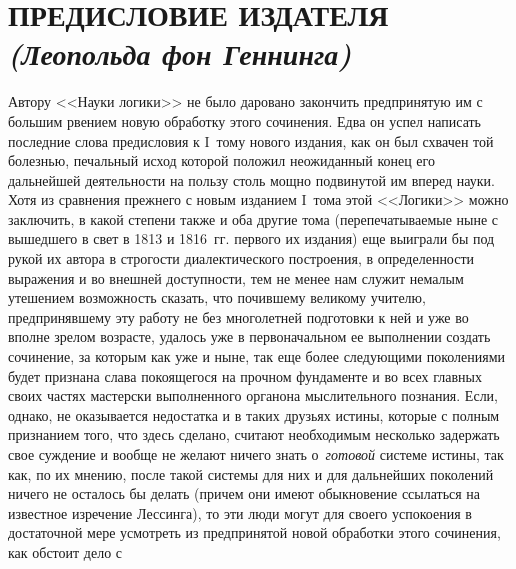 \hrulefill

\chapter[\mdseries Предисловие издателя (Леопольда фон Геннинга)]%
{ПРЕДИСЛОВИЕ ИЗДАТЕЛЯ\\{\em (Леопольда фон Геннинга)}}

Автору <<Науки логики>> не было даровано закончить предпринятую им с большим
рвением новую обработку этого сочинения. Едва он успел написать последние
слова предисловия к I~тому нового издания, как он был схвачен той болезнью,
печальный исход которой положил неожиданный конец его дальнейшей
деятельности на пользу столь мощно подвинутой им вперед науки. Хотя из
сравнения прежнего с новым изданием I~тома этой <<Логики>> можно заключить, в
какой степени также и оба другие тома (перепечатываемые ныне с вышедшего в
свет в 1813 и 1816~гг. первого их издания) еще выиграли бы под рукой их
автора в строгости диалектического построения, в определенности выражения и
во внешней доступности, тем не менее нам служит немалым утешением
возможность сказать, что почившему великому учителю, предпринявшему эту
работу не без многолетней подготовки к ней и уже во вполне зрелом возрасте,
удалось уже в первоначальном ее выполнении создать сочинение, за которым
как уже и ныне, так еще более следующими поколениями будет признана слава
покоящегося на прочном фундаменте и во всех главных своих частях мастерски
выполненного органона мыслительного познания. Если, однако, не оказывается
недостатка и в таких друзьях истины, которые с полным признанием того, что
здесь сделано, считают необходимым несколько задержать свое суждение и
вообще не желают ничего знать о~{\em готовой} системе
истины, так как, по их мнению, после такой системы для них и для дальнейших
поколений ничего не осталось бы делать (причем они имеют обыкновение
ссылаться на известное изречение Лессинга), то эти люди могут для своего успокоения в достаточной мере
усмотреть из предпринятой новой обработки этого сочинения, как обстоит дело с
